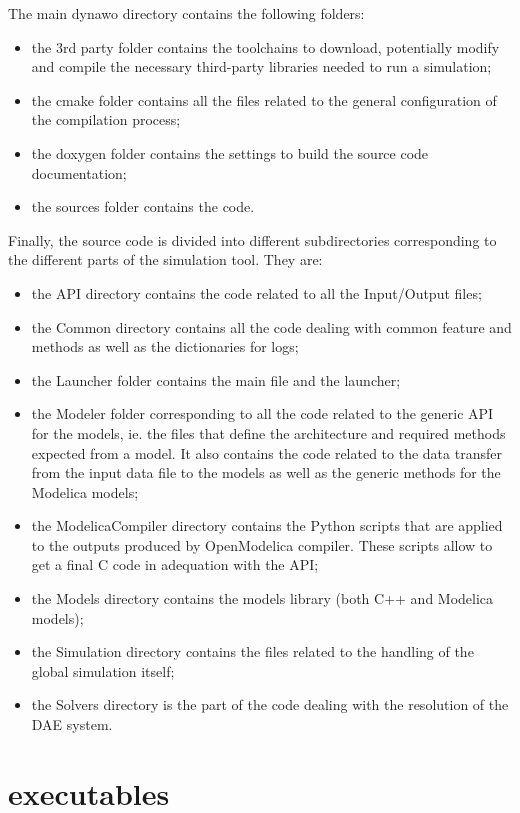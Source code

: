 \documentclass[a4paper, 12pt]{report}
\begin{document}
The main dynawo directory contains the following folders:
\begin{itemize}
\item the 3rd party folder contains the toolchains to download, potentially
modify and compile the necessary third-party libraries needed to run a \Dynawo
simulation;
\item the cmake folder contains all the files related to the general
configuration of the compilation process;
\item the doxygen folder contains the \Dynawo settings to build the source code
documentation;
\item the sources folder contains the \Dynawo code.
\end{itemize}

Finally, the source code is divided into different subdirectories corresponding to the different parts of the \Dynawo simulation tool. They are:
\begin{itemize}
\item the API directory contains the code related to all the Input/Output
files;
\item the Common directory contains all the code dealing with common feature and methods as well as the dictionaries for logs;
\item the Launcher folder contains the main file and the launcher;
\item the Modeler folder corresponding to all the code related to the generic
API for the models, ie. the files that define the architecture and required
methods expected from a model. It also contains the code related to the data transfer from the input data file to the models as well as the generic methods for the Modelica models;
\item the ModelicaCompiler directory contains the Python scripts that are
applied to the outputs produced by OpenModelica compiler. These scripts allow to
get a final C code in adequation with the \Dynawo API;
\item the Models directory contains the \Dynawo models library (both C++ and
Modelica models);
\item the Simulation directory contains the files related to the handling
of the global simulation itself;
\item the Solvers directory is the part of the code dealing with the resolution of the DAE system.
\end{itemize}

\section[Dynawo executables]{\Dynawo executables}
\label{Dynawo_Advanced_Documentation_Dynawo_executables}
\end{document}
